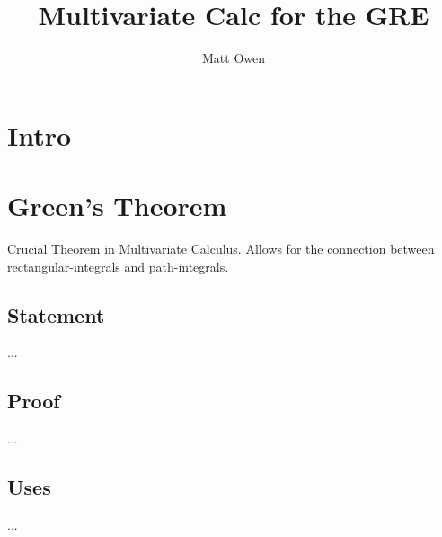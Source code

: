 \documentclass[11pt,twoside,a4paper]{article}
\title{Multivariate Calc for the GRE}
\author{Matt Owen}
\begin{document}
\maketitle
\tableofcontents
\cleardoublepage

\section{Intro}
\label{intro}

%
%

\section{Green's Theorem}
\label{green-s-theorem}

Crucial Theorem in Multivariate Calculus. Allows for the connection between rectangular-integrals and path-integrals.

\subsection{Statement}
...

\subsection{Proof}
...

\subsection{Uses}
...
\end{document}
